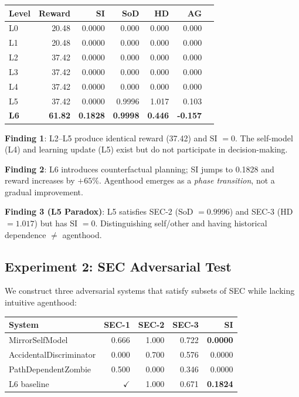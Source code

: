 \documentclass[11pt,a4paper]{article}
\begin{document}
\begin{table}[h]
\centering
\begin{tabular}{lrrrrrr}
\toprule
Level & Reward & SI & SoD & HD & AG \\
\midrule
L0 & 20.48 & 0.0000 & 0.000 & 0.000 & 0.000 \\
L1 & 20.48 & 0.0000 & 0.000 & 0.000 & 0.000 \\
L2 & 37.42 & 0.0000 & 0.000 & 0.000 & 0.000 \\
L3 & 37.42 & 0.0000 & 0.000 & 0.000 & 0.000 \\
L4 & 37.42 & 0.0000 & 0.000 & 0.000 & 0.000 \\
L5 & 37.42 & 0.0000 & 0.9996 & 1.017 & 0.103 \\
\textbf{L6} & \textbf{61.82} & \textbf{0.1828} & \textbf{0.9998} & \textbf{0.446} & \textbf{-0.157} \\
\bottomrule
\end{tabular}
\end{table}

\textbf{Finding 1}: L2--L5 produce identical reward (37.42) and SI $= 0$. The self-model (L4) and learning update (L5) exist but do not participate in decision-making.

\textbf{Finding 2}: L6 introduces counterfactual planning; SI jumps to 0.1828 and reward increases by $+65\%$. Agenthood emerges as a \emph{phase transition}, not a gradual improvement.

\textbf{Finding 3 (L5 Paradox)}: L5 satisfies SEC-2 (SoD $= 0.9996$) and SEC-3 (HD $= 1.017$) but has SI $= 0$. Distinguishing self/other and having historical dependence $\neq$ agenthood.

\subsection{Experiment 2: SEC Adversarial Test}

We construct three adversarial systems that satisfy subsets of SEC while lacking intuitive agenthood:

\begin{table}[h]
\centering
\begin{tabular}{lrrrr}
\toprule
System & SEC-1 & SEC-2 & SEC-3 & SI \\
\midrule
MirrorSelfModel & 0.666 & 1.000 & 0.722 & \textbf{0.0000} \\
AccidentalDiscriminator & 0.000 & 0.700 & 0.576 & 0.0000 \\
PathDependentZombie & 0.500 & 0.000 & 0.346 & 0.0000 \\
L6 baseline & $\checkmark$ & 1.000 & 0.671 & \textbf{0.1824} \\
\bottomrule
\end{tabular}
\end{table}
\end{document}
